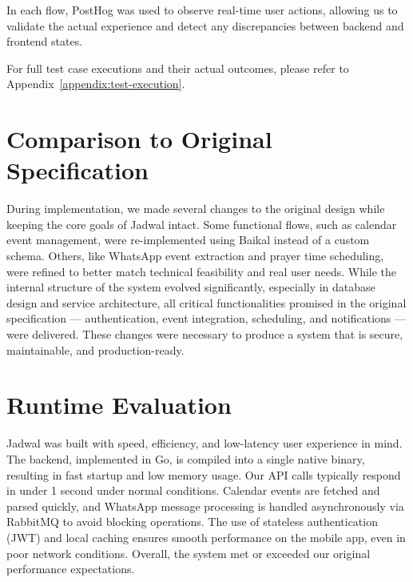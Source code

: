 In each flow, PostHog was used to observe real-time user actions, allowing us to validate the actual experience and detect any discrepancies between backend and frontend states.

For full test case executions and their actual outcomes, please refer to Appendix~\ref{appendix:test-execution}.

\section{Comparison to Original Specification}

During implementation, we made several changes to the original design while keeping the core goals of Jadwal intact. Some functional flows, such as calendar event management, were re-implemented using Baikal instead of a custom schema. Others, like WhatsApp event extraction and prayer time scheduling, were refined to better match technical feasibility and real user needs. While the internal structure of the system evolved significantly, especially in database design and service architecture, all critical functionalities promised in the original specification — authentication, event integration, scheduling, and notifications — were delivered. These changes were necessary to produce a system that is secure, maintainable, and production-ready.

\section{Runtime Evaluation}

Jadwal was built with speed, efficiency, and low-latency user experience in mind. The backend, implemented in Go, is compiled into a single native binary, resulting in fast startup and low memory usage. Our API calls typically respond in under 1 second under normal conditions. Calendar events are fetched and parsed quickly, and WhatsApp message processing is handled asynchronously via RabbitMQ to avoid blocking operations. The use of stateless authentication (JWT) and local caching ensures smooth performance on the mobile app, even in poor network conditions. Overall, the system met or exceeded our original performance expectations.
